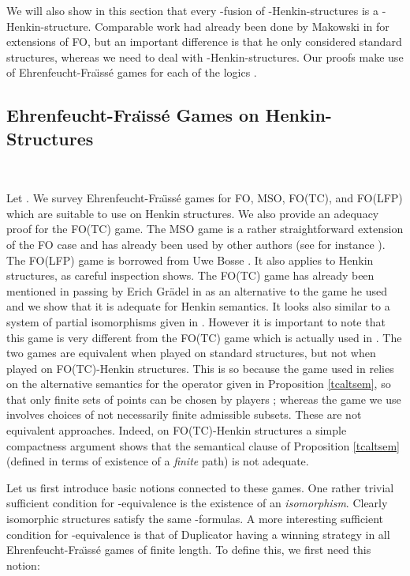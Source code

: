 \documentclass{LMCS}
\newcommand{\fo}{\textsf{FO}\xspace}
\newcommand{\mso}{\textsf{MSO}\xspace}
\newcommand{\fotc}{\textsf{FO(TC)}\xspace}
\newcommand{\folfp}{\textsf{FO(LFP)}\xspace}
\begin{document}
We will also show in this section that every -fusion of -Henkin-structures is a -Henkin-structure.
Comparable work had already been done by Makowski in \cite{2004}
for extensions of \fo, but an important difference is that he only
considered standard structures, whereas we need to deal with
-Henkin-structures. Our proofs make use of
Ehrenfeucht-Fra\"{\i}ss\'e games for each of the
logics . 

\subsection{Ehrenfeucht-Fra\"\i ss\'e Games on Henkin-Structures}\
\label{apb}

\noindent
Let . We survey Ehrenfeucht-Fra\"{\i}ss\'e games
for \fo, \mso, \fotc, and \folfp which are suitable to use on Henkin structures.
We also provide an adequacy proof for the \fotc game. 
The \mso game is a rather straightforward
extension of the \fo case and has already been used by other
authors (see for instance \cite{1998}). The \folfp game is
borrowed from Uwe Bosse \cite{736408}. It also applies to Henkin
structures, as careful inspection shows. The \fotc game has
already been mentioned in passing by Erich Gr\"{a}del in \cite{736267}
as an alternative to the game he used and we show that it is
adequate for Henkin semantics. It looks also similar to a system
of partial isomorphisms given in \cite{1992}. However it is
important to note that this game is very different from the
\fotc game which is actually used in \cite{736267}. The two games
are equivalent when played on standard structures, but not when
played on \fotc-Henkin structures. This is so because the game
used in \cite{1992} relies on the alternative semantics for the
 operator given in Proposition \ref{tcaltsem}, so that only
finite sets of points can be chosen by players ; whereas the game
we use involves choices of not necessarily finite admissible
subsets. These are not equivalent approaches. Indeed, on
\fotc-Henkin structures a simple compactness argument shows that
the semantical clause of Proposition \ref{tcaltsem} (defined in
terms of existence of a \emph{finite} path) is not adequate.



Let us first introduce basic notions connected to these games. One
rather trivial sufficient condition for -equivalence is
the existence of an \emph{isomorphism}.  Clearly isomorphic
structures satisfy the same -formulas.  A more
interesting sufficient condition for -equivalence is that
of Duplicator having a winning strategy in all 
Ehrenfeucht-Fra\"{\i}ss\'e games of finite length. To define this,
we first need this notion:
\end{document}
